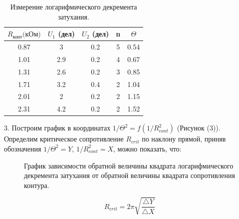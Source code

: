 \documentclass[a4paper,12pt]{article} %
\begin{document}
\begin{table}[H]
\caption{\label{tab:canonsummary} Измерение логарифмического декремента затухания.}
\begin{center}
\begin{tabular}{|c|c|c|c|c|}
\hline
$R_\text{конт} \text{(кОм)}$ & $U_1$ (дел) & $U_2$ (дел) & n & $\Theta$\\
\hline
0.87 & 3 & 0.2 & 5 & 0.54\\
\hline
1.01 & 2.9 & 0.2 & 4 & 0.67\\
\hline
1.31 & 2.6 & 0.2 & 3 & 0.85\\
\hline
1.71 & 3.2 & 0.4 & 2 & 1.04\\
\hline
2.01 & 2 & 0.2 & 2 & 1.15\\
\hline
2.31 & 4.2 & 0.2 & 2 & 1.52\\
\hline
\end{tabular}
\end{center}
\label{table2:ref}
\end{table}

3. Построим график в координатах $1 / \Theta^2 = f(1 / R^2_{cont})$ (Рисунок (3)). Определим критическое сопротивление $R_{crit}$ по наклону прямой, приняв обозначения $1/\Theta^2 = Y$, $1 / R^2_{cont} = X$, можно показать, что:

\begin{figure}[h]\label{theta_graph}
	\caption{График зависимости обратной величины квадрата логарифмического декремента затухания от обратной величины квадрата сопротивления контура.}
\label{fig:image}
\end{figure}

\begin{equation}\label{2.100}
R_{crit} = 2\pi \sqrt{\frac{\bigtriangleup Y}{\bigtriangleup X}}
\end{equation}
\end{document}
